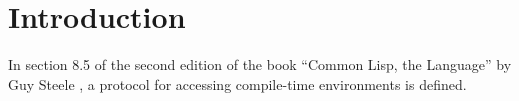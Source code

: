 \chapter{Introduction}

In section 8.5 of the second edition of the book ``Common Lisp, the
Language'' by Guy Steele \cite{Steele:1990:CLL:95411}, a protocol for
accessing compile-time environments is defined.
